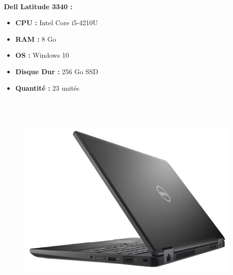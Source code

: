 \documentclass[11pt,a4paper,oneside]{article}
\begin{document}
\paragraph{}\textbf{Dell Latitude 3340 :} \\
\begin{itemize}
\item \textbf{CPU :} Intel Core i5-4210U
\item \textbf{RAM :} 8 Go
\item \textbf{OS :} Windows 10
\item \textbf{Disque Dur :} 256 Go SSD
\item \textbf{Quantité :} 23 unités
\\ \\ \\ \\
\end{itemize}
\begin{figure}
\includegraphics[scale=0.35]{Ressources/Materiel/L5591.jpg}\vspace{-2cm}
\end{figure}
\end{document}
